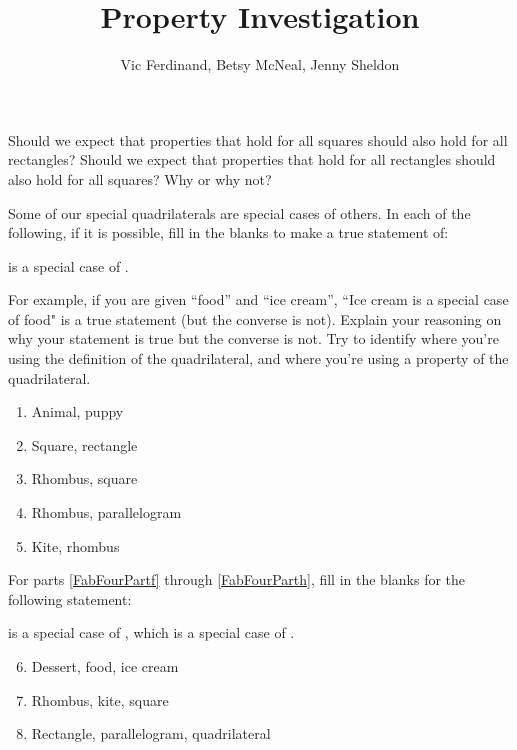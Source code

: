 \documentclass[nooutcomes]{ximera}
\title{Property Investigation}
\author{Vic Ferdinand, Betsy McNeal, Jenny Sheldon}
\begin{document}
\begin{abstract}\end{abstract}
\maketitle



\begin{problem} Should we expect that properties that hold for all squares should also hold for all rectangles?  Should we expect that properties that hold for all rectangles should also hold for all squares?  Why or why not? 
\end{problem}



\begin{problem} \label{PropInv2}
Some of our special quadrilaterals are special cases of others.  In each of the following, if it is possible, fill in the blanks to make a true statement of:

\begin{center} \underline{\hspace{1in}} is a special case of \underline{\hspace{1in}}. \end{center}

For example, if you are given ``food'' and ``ice cream'', ``Ice cream is a special case of food" is a true statement (but the converse is not).  Explain your reasoning on why your statement is true but the converse is not.  Try to identify where you're using the definition of the quadrilateral, and where you're using a property of the quadrilateral.
\begin{enumerate}
\item  Animal, puppy
\item  Square, rectangle
\item Rhombus, square
\item  Rhombus, parallelogram
\item  Kite, rhombus
\end{enumerate}

For parts \ref{FabFourPartf} through \ref{FabFourParth}, fill in the blanks for the following statement:

\begin{center} \underline{\hspace{0.5in}} is a special case of \underline{\hspace{0.5in}}, which is a special case of \underline{\hspace{0.5in}}. \end{center}

\begin{enumerate}
\setcounter{enumi}{5}
    \item Dessert, food, ice cream \label{FabFourPartf}
    \item  Rhombus, kite, square
    \item Rectangle, parallelogram, quadrilateral \label{FabFourParth}
\end{enumerate}
\end{problem}
\end{document}
